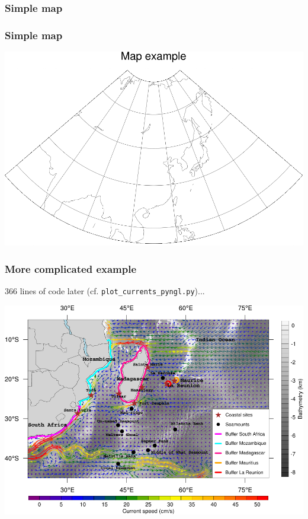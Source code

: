\documentclass{beamer}
\begin{document}
\begin{frame}[fragile]
\frametitle{Simple map}

\end{frame}

\begin{frame}[fragile]
\frametitle{Simple map}
    \begin{center}
    \includegraphics[scale=0.3]{progs/conmasklc.png}
    \end{center}
\end{frame}

\begin{frame}[fragile]
\frametitle{More complicated example}
    366 lines of code later (cf. \verb+plot_currents_pyngl.py+)...
    \begin{center}
    \includegraphics[scale=0.3]{progs/oscar_traj_mean.png}
    \end{center}
\end{frame}
\end{document}
